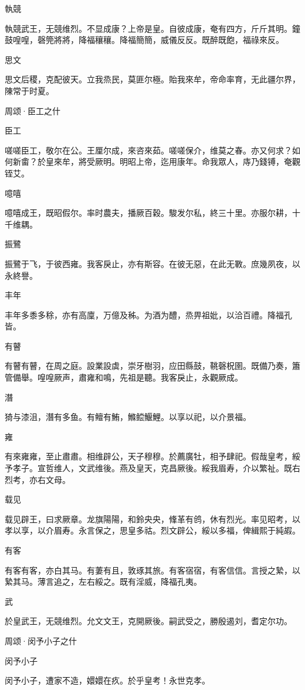 執競

執競武王，无競维烈。不显成康？上帝是皇。自彼成康，奄有四方，斤斤其明。鐘鼓喤喤，磬筦將將，降福穰穰。降福簡簡，威儀反反。既醉既飽，福祿來反。

思文

思文后稷，克配彼天。立我烝民，莫匪尔極。貽我來牟，帝命率育，无此疆尔界，陳常于时夏。




周颂·臣工之什


臣工

嗟嗟臣工，敬尔在公。王厘尔成，來咨來茹。嗟嗟保介，维莫之春。亦又何求？如何新畬？於皇來牟，將受厥明。明昭上帝，迄用康年。命我眾人，庤乃錢镈，奄觀铚艾。

噫嘻

噫嘻成王，既昭假尔。率时農夫，播厥百穀。駿发尔私，終三十里。亦服尔耕，十千维耦。

振鷺

振鷺于飞，于彼西雍。我客戾止，亦有斯容。在彼无惡，在此无斁。庶幾夙夜，以永終譽。

丰年

丰年多黍多稌，亦有高廩，万億及秭。为酒为醴，烝畀祖妣，以洽百禮。降福孔皆。

有瞽

有瞽有瞽，在周之庭。設業設虡，崇牙樹羽，应田縣鼓，鞉磬柷圉。既備乃奏，簫管備舉。喤喤厥声，肅雍和鳴，先祖是聽。我客戾止，永觀厥成。

潛

猗与漆沮，潛有多鱼。有鳣有鮪，鰷鲿鰋鯉。以享以祀，以介景福。

雍

有來雍雍，至止肅肅。相维辟公，天子穆穆。於薦廣牡，相予肆祀。假哉皇考，綏予孝子。宣哲维人，文武维後。燕及皇天，克昌厥後。綏我眉寿，介以繁祉。既右烈考，亦右文母。

载见

载见辟王，曰求厥章。龙旗陽陽，和鈴央央，鞗革有鸧，休有烈光。率见昭考，以孝以享，以介眉寿。永言保之，思皇多祜。烈文辟公，綏以多福，俾緝熙于純嘏。

有客

有客有客，亦白其马。有萋有且，敦琢其旅。有客宿宿，有客信信。言授之縶，以縶其马。薄言追之，左右綏之。既有淫威，降福孔夷。

武

於皇武王，无競维烈。允文文王，克開厥後。嗣武受之，勝殷遏刘，耆定尔功。




周颂·闵予小子之什


闵予小子

闵予小子，遭家不造，嬛嬛在疚。於乎皇考！永世克孝。

